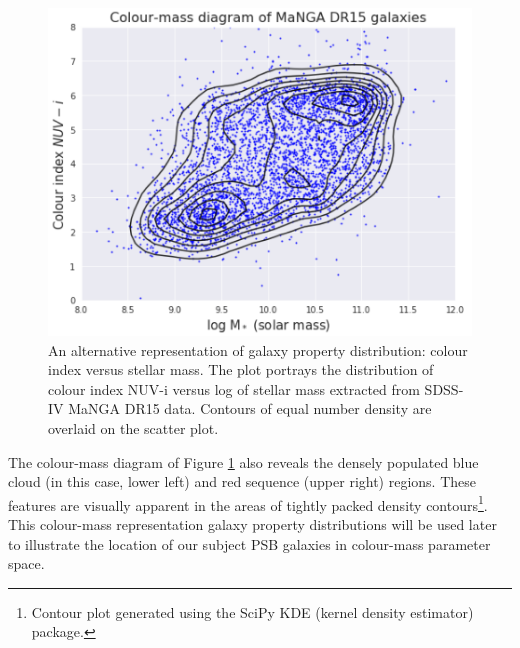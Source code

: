 \begin{figure}
    \centering
    \includegraphics[width=\columnwidth]{images/CMDs/Colour-Mass-DR15-All.png}
    \caption[Colour-mass diagram of the complete MaNGA DR15 population]{An alternative representation of galaxy property distribution: colour index versus stellar mass. The plot portrays the distribution of colour index NUV-i versus log of stellar mass extracted from SDSS-IV MaNGA DR15 data. Contours of equal number density are overlaid on the scatter plot.}
    \label{fig:CMD-mass-1}
\end{figure}

The colour-mass diagram of Figure \ref{fig:CMD-mass-1} also reveals the densely populated blue cloud (in this case, lower left) and red sequence (upper right) regions. These  features are visually apparent in the areas of tightly packed density contours\footnote{Contour plot generated using the SciPy KDE (kernel density estimator) package.}. This colour-mass representation galaxy property distributions will be used later to illustrate the location of our subject PSB galaxies in colour-mass parameter space.

